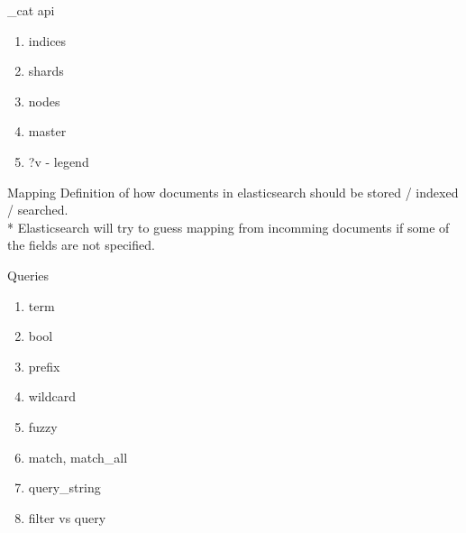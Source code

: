 \documentclass{beamer}
\begin{document}
\begin{frame}{\_cat api}
	\begin{enumerate}
		\item indices
		\item shards
		\item nodes
		\item master
		\item ?v - legend
	\end{enumerate}
\end{frame}
\begin{frame}{Mapping}
	Definition of how documents in elasticsearch should be stored / indexed / searched. \\*
	Elasticsearch will try to guess mapping from incomming documents if some of the fields are not specified.
\end{frame}
\begin{frame}{Queries}
	\begin{enumerate}
		\item term
		\item bool
		\item prefix
		\item wildcard
		\item fuzzy
		\item match, match\_all
		\item query\_string
		\item filter vs query
	\end{enumerate}
\end{frame}
\end{document}
